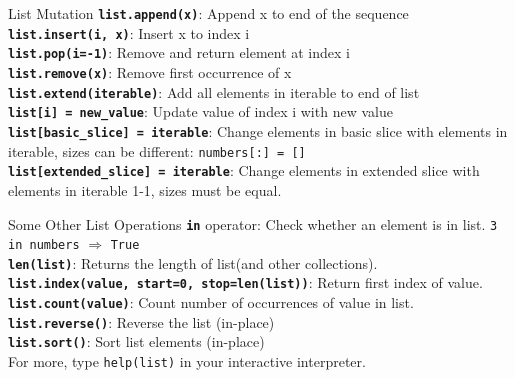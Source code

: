         \begin{frame}{List Mutation}
            \LARGE
            \pause
            \textbf{\texttt{list.append(x)}}: Append x to end of the sequence\\
            \pause
            \textbf{\texttt{list.insert(i, x)}}: Insert x to index i\\
            \pause
            \textbf{\texttt{list.pop(i=-1)}}: Remove and return element at index i\\
            \pause
            \textbf{\texttt{list.remove(x)}}: Remove first occurrence of x\\
            \pause
            \textbf{\texttt{list.extend(iterable)}}: Add all elements in iterable to end of list\\
            \pause
            \textbf{\texttt{list[i] = new\_value}}: Update value of index i with new value\\
            \pause
            \textbf{\texttt{list[basic\_slice] = iterable}}: Change elements in basic slice with elements in iterable, sizes can be different: \texttt{numbers[:] = []}\\
            \pause
            \textbf{\texttt{list[extended\_slice] = iterable}}: Change elements in extended slice with elements in iterable 1-1, sizes must be equal.\\
        \end{frame}

        \begin{frame}{Some Other List Operations}
            \LARGE
            \textbf{\texttt{in}} operator: Check whether an element is in list. \texttt{3 in numbers} $\Rightarrow$ \texttt{True}\\
            \textbf{\texttt{len(list)}}: Returns the length of list(and other collections).\\
            \textbf{\texttt{list.index(value, start=0, stop=len(list))}}: Return first index of value.\\
            \textbf{\texttt{list.count(value)}}: Count number of occurrences of value in list.\\
            \textbf{\texttt{list.reverse()}}: Reverse the list (in-place)\\
            \textbf{\texttt{list.sort()}}: Sort list elements (in-place)\\
            For more, type \texttt{help(list)} in your interactive interpreter.
        \end{frame}
    
